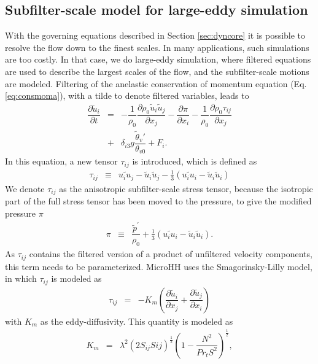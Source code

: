 \documentclass[gmd]{copernicus}
\newcommand{\uf}{\ensuremath{\widetilde{u}}}
\newcommand{\thetaf}{\ensuremath{\widetilde{\theta}}}
\begin{document}
\subsection{Subfilter-scale model for large-eddy simulation}
With the governing equations described in Section \ref{sec:dyncore} it is possible to resolve the flow down to the finest scales. In many applications, such simulations are too costly. In that case, we do large-eddy simulation, where filtered equations are used to describe the largest scales of the flow, and the subfilter-scale motions are modeled. Filtering of the anelastic conservation of momentum equation (Eq. \ref{eq:consmoma}), with a tilde to denote filtered variables, leads to 
\begin{eqnarray}
\nonumber \dfrac{\partial \uf_i}{\partial t} & = & - \dfrac{1}{\rho_0} \dfrac{\partial \rho_0 \uf_i \uf_j}{\partial x_j} 
- \dfrac{\partial \pi}{\partial x_i} - \dfrac{1}{\rho_0} \dfrac{\partial \rho_0 \tau_{ij}}{\partial x_j}\\
& + & \delta_{i3} g \dfrac{\thetaf_v'}{\theta_{v0}} + F_i.\label{eq:consmoma_filter}
\end{eqnarray}
In this equation, a new tensor $\tau_{ij}$ is introduced, which is defined as
\begin{eqnarray}
\tau_{ij}  & \equiv & \widetilde{u_i u_j} - \uf_i \uf_j - \frac{1}{3} \left( \widetilde{u_i u_i} - \uf_i \uf_i \right)
\end{eqnarray}
We denote $\tau_{ij}$ as the anisotropic subfilter-scale stress tensor, because the isotropic part of the full stress tensor has been moved to the pressure, to give the modified pressure $\pi$
\begin{eqnarray}
\pi & \equiv & \dfrac{\widetilde{p}^\prime}{\rho_0} + \frac{1}{3} \left( \widetilde{u_i u_i} - \uf_i \uf_i \right).
\end{eqnarray}
As $\tau_{ij}$ contains the filtered version of a product of unfiltered velocity components, this term needs to be parameterized. MicroHH uses the Smagorinsky-Lilly \citep{Lilly1968} model, in which $\tau_{ij}$ is modeled as
\begin{eqnarray}
\tau_{ij} & = & -K_m \left( \dfrac{\partial \uf_i}{\partial x_j} + \dfrac{\partial \uf_j}{\partial x_i} \right)
\end{eqnarray}
with $K_m$ as the eddy-diffusivity. This quantity is modeled as 
\begin{eqnarray}
K_m    & = & \lambda^2 \left( 2 S_{ij} S{ij} \right)^\frac{1}{2}
\left(1 - \dfrac{N^2}{Pr_t S^2} \right)^\frac{1}{2},
\end{eqnarray}
\end{document}
